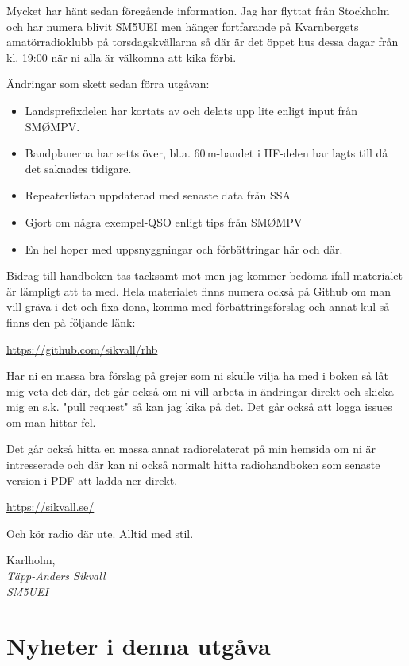 Mycket har hänt sedan föregående information. Jag har flyttat från
Stockholm och har numera blivit SM5UEI men hänger fortfarande på
Kvarnbergets amatörradioklubb på torsdagskvällarna så där är det öppet
hus dessa dagar från kl. 19:00 när ni alla är välkomna att kika förbi.

Ändringar som skett sedan förra utgåvan:

\begin{itemize}[]
	\item Landsprefixdelen har kortats av och delats upp lite enligt 
	input från SMØMPV.
	\item Bandplanerna har setts över, bl.a. 60\,m-bandet i HF-delen 
	har lagts till då det saknades tidigare.
	\item Repeaterlistan uppdaterad med senaste data från SSA
	\item Gjort om några exempel-QSO enligt tips från SMØMPV
	\item En hel hoper med uppsnyggningar och förbättringar här och där.
\end{itemize}

Bidrag till handboken tas tacksamt mot men jag kommer bedöma ifall
materialet är lämpligt att ta med.  Hela materialet finns numera också
på Github om man vill gräva i det och fixa-dona, komma med 
förbättrings\-förslag och annat kul så finns den på följande länk:

\href{https://github.com/sikvall/rhb/}{https://github.com/sikvall/rhb}

Har ni en massa bra förslag på grejer som ni skulle vilja ha med i boken
så låt mig veta det där, det går också om ni vill arbeta in ändringar direkt
och skicka mig en s.k. "pull request" så kan jag kika på det. Det går också
att logga issues om man hittar fel.

Det går också hitta en massa annat radiorelaterat på min hemsida om ni 
är intresserade och där kan ni också normalt hitta radiohandboken som 
senaste version i PDF att ladda ner direkt.

\href{https://sikvall.se}{https://sikvall.se/}

Och kör radio där ute. Alltid med stil.

\vspace{4mm}

Karlholm, \DokumentDatum\\
\textit{Täpp-Anders Sikvall\\
	SM5UEI}

\clearpage

\section*{Nyheter i denna utgåva}

